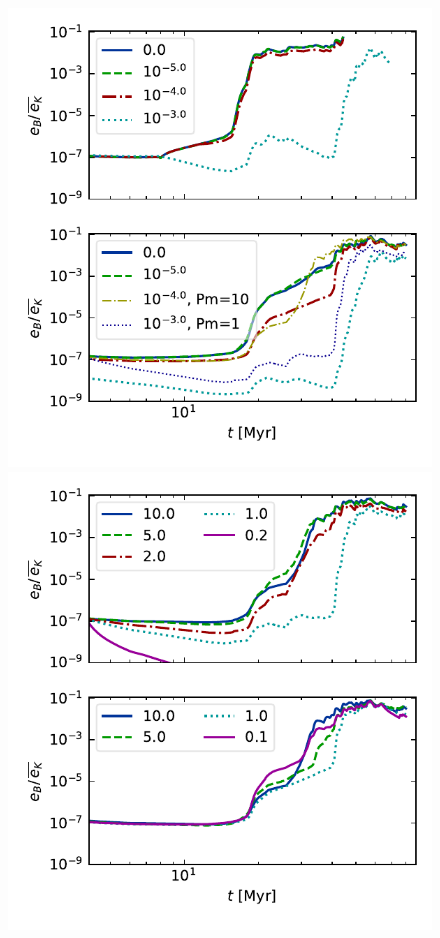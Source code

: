 \documentclass[preprint2]{aastex63}
\begin{document}
\begin{figure}
  \includegraphics[trim=0.5cm 0.0cm 0.3cm 0.0cm, clip=true,width=\columnwidth]{figs/1pc-eB-nu4.pdf}
  \includegraphics[trim=0.5cm 0.0cm 0.3cm 0.0cm, clip=true,width=\columnwidth]{figs/1pc-eB-nu5.pdf}\\

\end{figure}
\end{document}
